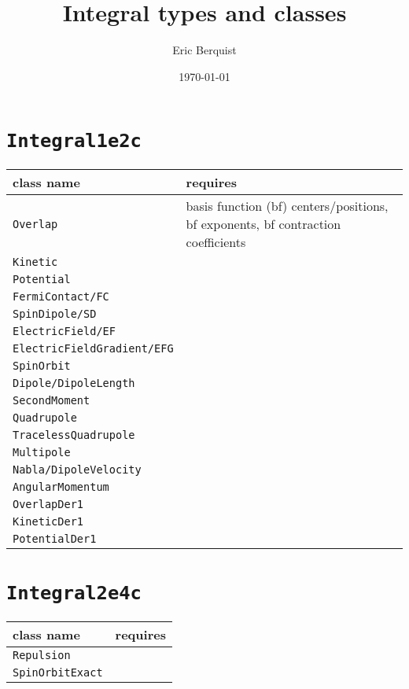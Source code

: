 \documentclass[12pt]{article}
\title{Integral types and classes}
\author{Eric Berquist}
\date{\today}
\begin{document}
\maketitle
\section{\texttt{Integral1e2c}}

\begin{tabulary}{1.00\linewidth}{lL}
  \toprule
  class name & requires \\
  \midrule
  \texttt{Overlap} & basis function (bf) centers/positions, bf exponents, bf contraction coefficients \\
  \texttt{Kinetic} \\
  \texttt{Potential} \\
  \texttt{FermiContact/FC} \\
  \texttt{SpinDipole/SD} \\
  \texttt{ElectricField/EF} \\
  \texttt{ElectricFieldGradient/EFG} \\
  \texttt{SpinOrbit} \\
  \texttt{Dipole/DipoleLength} \\
  \texttt{SecondMoment} \\
  \texttt{Quadrupole} \\
  \texttt{TracelessQuadrupole} \\
  \texttt{Multipole} \\
  \texttt{Nabla/DipoleVelocity} \\
  \texttt{AngularMomentum} \\
  \texttt{OverlapDer1} \\
  \texttt{KineticDer1} \\
  \texttt{PotentialDer1} \\
  \bottomrule
\end{tabulary}

\section{\texttt{Integral2e4c}}

\begin{tabulary}{1.00\linewidth}{lL}
  \toprule
  class name & requires \\
  \midrule
  \texttt{Repulsion} \\
  \texttt{SpinOrbitExact} \\
  \bottomrule
\end{tabulary}
\end{document}
